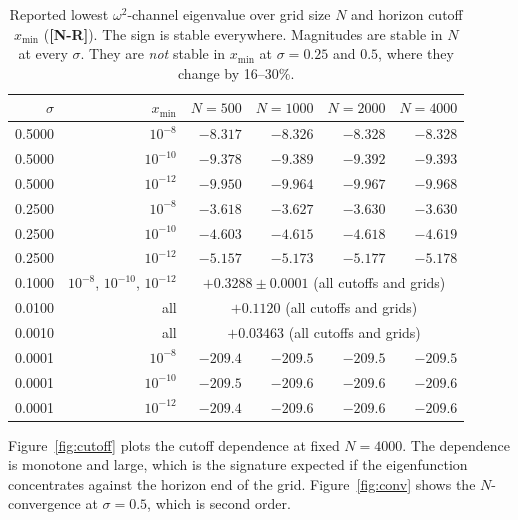 \documentclass[11pt,a4paper]{article}
\newcommand{\VN}{\textcolor{vn}{\textbf{[N-R]}}}
\theoremstyle{remark}
\theoremstyle{definition}
\begin{document}
\begin{table}[H]
\centering
\caption{Reported lowest $\omega^2$-channel eigenvalue over grid size $N$ and horizon cutoff $x_{\min}$ (\VN). The sign is stable everywhere. Magnitudes are stable in $N$ at every $\sigma$. They are \emph{not} stable in $x_{\min}$ at $\sigma = 0.25$ and $0.5$, where they change by 16--30\%.}
\label{tab:conv}
\small
\begin{tabular}{@{}rrrrrr@{}}
\toprule
$\sigma$ & $x_{\min}$ & $N=500$ & $N=1000$ & $N=2000$ & $N=4000$ \\
\midrule
0.5000 & $10^{-8}$  & $-8.317$ & $-8.326$ & $-8.328$ & $-8.328$ \\
0.5000 & $10^{-10}$ & $-9.378$ & $-9.389$ & $-9.392$ & $-9.393$ \\
0.5000 & $10^{-12}$ & $-9.950$ & $-9.964$ & $-9.967$ & $-9.968$ \\
0.2500 & $10^{-8}$  & $-3.618$ & $-3.627$ & $-3.630$ & $-3.630$ \\
0.2500 & $10^{-10}$ & $-4.603$ & $-4.615$ & $-4.618$ & $-4.619$ \\
0.2500 & $10^{-12}$ & $-5.157$ & $-5.173$ & $-5.177$ & $-5.178$ \\
0.1000 & $10^{-8}$, $10^{-10}$, $10^{-12}$ & \multicolumn{4}{c}{$+0.3288 \pm 0.0001$ (all cutoffs and grids)} \\
0.0100 & all & \multicolumn{4}{c}{$+0.1120$ (all cutoffs and grids)} \\
0.0010 & all & \multicolumn{4}{c}{$+0.03463$ (all cutoffs and grids)} \\
0.0001 & $10^{-8}$  & $-209.4$ & $-209.5$ & $-209.5$ & $-209.5$ \\
0.0001 & $10^{-10}$ & $-209.5$ & $-209.6$ & $-209.6$ & $-209.6$ \\
0.0001 & $10^{-12}$ & $-209.4$ & $-209.6$ & $-209.6$ & $-209.6$ \\
\bottomrule
\end{tabular}
\end{table}

Figure~\ref{fig:cutoff} plots the cutoff dependence at fixed $N=4000$. The dependence is monotone and large, which is the signature expected if the eigenfunction concentrates against the horizon end of the grid. Figure~\ref{fig:conv} shows the $N$-convergence at $\sigma=0.5$, which is second order.
\end{document}
